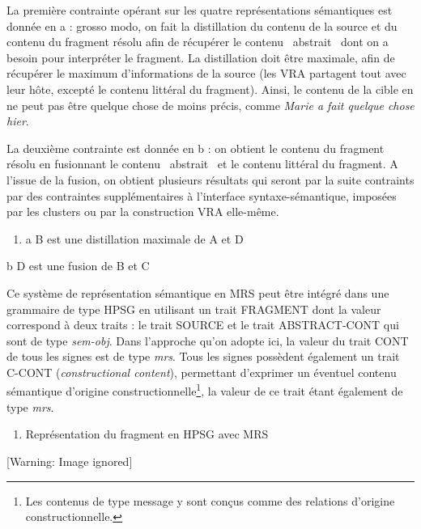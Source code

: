 La première contrainte opérant sur les quatre représentations sémantiques est donnée en a : grosso modo, on fait la distillation du contenu de la source et du contenu du fragment résolu afin de récupérer le contenu {\guillemotleft}~abstrait~{\guillemotright} dont on a besoin pour interpréter le fragment. La distillation doit être maximale, afin de récupérer le maximum d'informations de la source (les VRA partagent tout avec leur hôte, excepté le contenu littéral du fragment). Ainsi, le contenu de la cible en  ne peut pas être quelque chose de moins précis, comme \textit{Marie a fait quelque chose hier}. 

La deuxième contrainte est donnée en b : on obtient le contenu du fragment résolu en fusionnant le contenu {\guillemotleft}~abstrait~{\guillemotright} et le contenu littéral du fragment. A l'issue de la fusion, on obtient plusieurs résultats qui seront par la suite contraints par des contraintes supplémentaires à l'interface syntaxe-sémantique, imposées par les clusters ou par la construction VRA elle-même.  


\begin{enumerate}
\item \label{bkm:Ref298864939}\label{bkm:Ref290579737}a  B est une distillation maximale de A et D~ 


\end{enumerate}
  b  D est une fusion de B et C

Ce système de représentation sémantique en MRS peut être intégré dans une grammaire de type HPSG en utilisant un trait FRAGMENT dont la valeur correspond à deux traits : le trait SOURCE et le trait ABSTRACT-CONT qui sont de type \textit{sem-obj}. Dans l'approche qu'on adopte ici, la valeur du trait CONT de tous les signes est de type \textit{mrs}. Tous les signes possèdent également un trait C-CONT (\textit{constructional content}), permettant d'exprimer un éventuel contenu sémantique d'origine constructionnelle\footnote{Les contenus de type message y sont conçus comme des relations d'origine constructionnelle.}, la valeur de ce trait étant également de type \textit{mrs}. 


\begin{enumerate}
\item \label{bkm:Ref298864805}Représentation du fragment en HPSG avec MRS


\end{enumerate}
  [Warning: Image ignored] %
 

